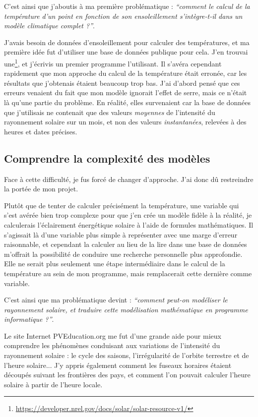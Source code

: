 \documentclass[12pt,a4paper]{article}
\begin{document}
C'est ainsi que j'aboutis à ma première problématique : \emph{``comment le calcul de la température d'un point en fonction de son ensoleillement s'intègre-t-il dans un modèle climatique complet ?''}.

J'avais besoin de données d'ensoleillement pour calculer des températures, et ma première idée fut d'utiliser une base de données publique pour cela.
J'en trouvai une\footnote{\url{https://developer.nrel.gov/docs/solar/solar-resource-v1/}}, et j'écrivis un premier programme l'utilisant.
Il s'avéra cependant rapidement que mon approche du calcul de la température était erronée, car les résultats que j'obtenais étaient beaucoup trop bas.
J'ai d'abord pensé que ces erreurs venaient du fait que mon modèle ignorait l'effet de serre, mais ce n'était là qu'une partie du problème.
En réalité, elles survenaient car la base de données que j'utilisais ne contenait que des valeurs \emph{moyennes} de l'intensité du rayonnement solaire sur un mois, et non des valeurs \emph{instantanées}, relevées à des heures et dates précises.

\subsection{Comprendre la complexité des modèles}
Face à cette difficulté, je fus forcé de changer d'approche.
J'ai donc dû restreindre la portée de mon projet.

Plutôt que de tenter de calculer précisément la température, une variable qui s'est avérée bien trop complexe pour que j'en crée un modèle fidèle à la réalité, je calculerais l'éclairement énergétique solaire à l'aide de formules mathématiques.
Il s'agissait là d'une variable plus simple à représenter avec une marge d'erreur raisonnable, et cependant la calculer au lieu de la lire dans une base de données m'offrait la possibilité de conduire une recherche personnelle plus approfondie.
Elle ne serait plus seulement une étape intermédiaire dans le calcul de la température au sein de mon programme, mais remplacerait cette dernière comme variable.

C'est ainsi que ma problématique devint : \emph{``comment peut-on modéliser le rayonnement solaire, et traduire cette modélisation mathématique en programme informatique ?''}.

Le site Internet PVEducation.org me fut d'une grande aide pour mieux comprendre les phénomènes conduisant aux variations de l'intensité du rayonnement solaire : le cycle des saisons, l'irrégularité de l'orbite terrestre et de l'heure solaire... J'y appris également comment les fuseaux horaires étaient découpés suivant les frontières des pays, et comment l'on pouvait calculer l'heure solaire à partir de l'heure locale.
\end{document}
